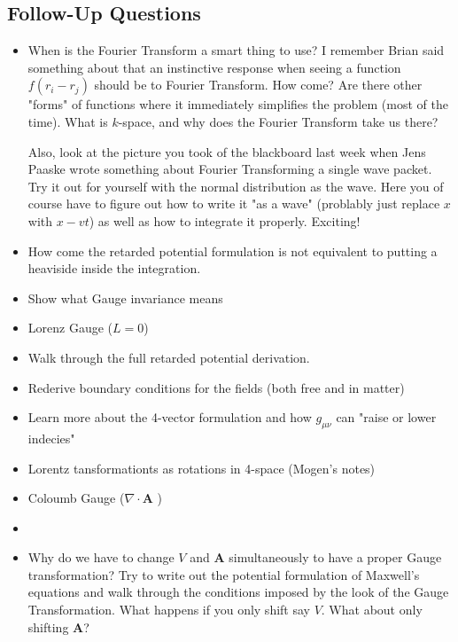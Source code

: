\subsection*{Follow-Up Questions}
\begin{itemize}
    \item When is the Fourier Transform a smart thing to use? I remember Brian said something about that an instinctive response when seeing a function \(f(r_i - r_j)\) should be to Fourier Transform. How come? Are there other "forms" of functions where it immediately simplifies the problem (most of the time). What is \(k\)-space, and why does the Fourier Transform take us there? 
    
    Also, look at the picture you took of the blackboard last week when Jens Paaske wrote something about Fourier Transforming a single wave packet. Try it out for yourself with the normal distribution as the wave. Here you of course have to figure out how to write it "as a wave" (problably just replace \(x\) with \(x - vt\)) as well as how to integrate it properly. Exciting!
    \item How come the retarded potential formulation is not equivalent to putting a heaviside inside the integration.
    \item Show what Gauge invariance means
    \item Lorenz Gauge (\(L = 0\))
    \item Walk through the full retarded potential derivation.
    \item Rederive boundary conditions for the fields (both free and in matter)
    \item Learn more about the 4-vector formulation and how \(g_{\mu \nu}\) can "raise or lower indecies"
    \item Lorentz tansformationts as rotations in 4-space (Mogen's notes)
    \item Coloumb Gauge (\(\nabla \cdot \mathbf{A}\) )
    \item {}
    \item Why do we have to change \(V\) and \(\mathbf{A}\) simultaneously to have a proper Gauge transformation? Try to write out the potential formulation of Maxwell's equations and walk through the conditions imposed by the look of the Gauge Transformation. What happens if you only shift say \(V\). What about only shifting \(\mathbf{A}\)? 
\end{itemize}
